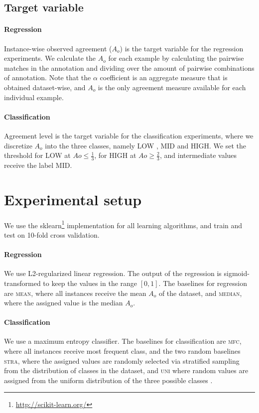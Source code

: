 \documentclass[11pt,a4paper]{article}
\begin{document}
\subsection{Target variable}
\paragraph*{Regression} Instance-wise observed agreement ($A_o$) is the target variable for the regression experiments. We calculate  the $A_o$ for each example by calculating the pairwise matches in the annotation and dividing over the amount of pairwise combinations of annotation. 
Note that the $\alpha$ coefficient is an aggregate measure that is obtained dataset-wise, and $A_o$ is the only agreement measure available for each individual example.
\paragraph*{Classification} Agreement level is the target variable for the classification experiments, where we discretize $A_o$ into the three classes, namely LOW , MID and HIGH. We set the threshold for LOW at $Ao \le \frac{1}{3}$, for HIGH at $Ao \ge \frac{2}{3}$, and intermediate values receive the label MID.


\section{Experimental setup}
We use the sklearn\footnote{\url{http://scikit-learn.org/}} implementation for all learning algorithms, and train and test on 10-fold cross validation.

\paragraph*{Regression} We use L2-regularized linear regression. The output of the regression is sigmoid-transformed to keep the values in the range $[0,1]$. The baselines for regression are \textsc{mean}, where all instances receive the mean $A_o$ of the dataset, and  \textsc{median}, where the assigned value is the median $A_o$. 

\paragraph*{Classification} We use a maximum entropy classifier. The baselines for classification are \textsc{mfc}, where all instances receive most frequent class, and the two random baselines \textsc{stra}, where the assigned values are randomly selected via stratified sampling from the distribution of classes in the dataset, and \textsc{uni} where random values are assigned from the uniform distribution of the three possible classes . 
\end{document}
